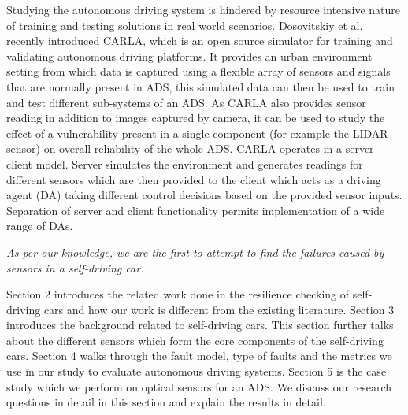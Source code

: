 Studying the autonomous driving system is hindered by resource intensive nature of training and testing solutions in real world scenarios. Dosovitskiy et al.~\cite{Dosovitskiy17} recently introduced CARLA, which is an open source simulator for training and validating autonomous driving platforms. It provides an urban environment setting from which data is captured using a flexible array of sensors and signals that are normally present in ADS, this simulated data can then be used to train and test different sub-systems of an ADS. As CARLA also provides sensor reading in addition to images captured by camera, it can be used to study the effect of a vulnerability present in a single component (for example the LIDAR sensor) on overall reliability of the whole ADS. CARLA operates in a server-client model. Server simulates the environment and generates readings for different sensors which are then provided to the client which acts as a driving agent (DA) taking different control decisions based on the provided sensor inputs. Separation of server and client functionality permits implementation of a wide range of DAs.

\emph{As per our knowledge, we are the first to attempt to find the failures caused by sensors in a self-driving car.}

Section 2 introduces the related work done in the resilience checking of self-driving cars and how our work is different from the existing literature. Section 3 introduces the background related to self-driving cars. This section further talks about the different sensors which form the core components of the self-driving cars. Section 4 walks through the fault model, type of faults and the metrics we use in our study to evaluate autonomous driving systems. Section 5 is the case study which we perform on optical sensors for an ADS. We discuss our research questions in detail in this section and explain the results in detail.